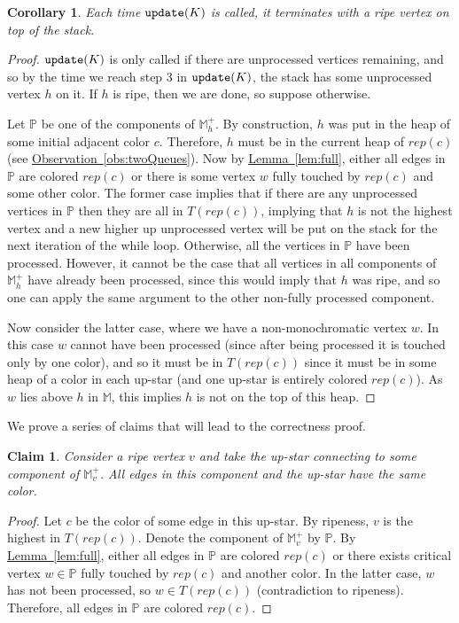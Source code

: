 \documentclass[11pt]{article}
\newtheorem{claim}[theorem]{Claim}
\newtheorem{corollary}[theorem]{Corollary}
\theoremstyle{definition}
\newcommand{\MM}{\mathbb{M}}
\newcommand{\PP}{\mathbb{P}}
\newcommand{\Lem}[1]{\hyperref[lem:#1]{Lemma~\ref*{lem:#1}}} %
\newcommand{\Obs}[1]{\hyperref[obs:#1]{Observation~\ref*{obs:#1}}} %
\newcommand{\rep}{rep}
\newcommand{\update}{{\tt update}}
\begin{document}
\begin{corollary}
\label{cor:terminate}
 Each time $\update(K)$ is called, it terminates with a ripe vertex on top of the stack.
\end{corollary}
\begin{proof}
 $\update(K)$ is only called if there are unprocessed vertices remaining, and so by the time we reach step 3 in 
 $\update(K)$, the stack has some unprocessed vertex $h$ on it.  
 If $h$ is ripe, then we are done, so suppose otherwise.
 
 Let $\PP$ be one of the components of $\MM^+_h$.  By construction, $h$ was put in the heap of some initial 
 adjacent color $c$.  Therefore, $h$ must be in the current heap of $\rep(c)$ (see \Obs{twoQueues}).  
 Now by \Lem{full}, either all edges in $\PP$ are colored $\rep(c)$ or  
 there is some vertex $w$ fully touched by $\rep(c)$ and some other color.  
 The former case implies that if there are any unprocessed vertices in $\PP$ then they are all in $T(\rep(c))$, 
 implying that $h$ is not the highest vertex and a new higher up unprocessed vertex will be put on the stack for the next iteration of the while loop.  
 Otherwise, all the vertices in $\PP$ have been processed.  
 However, it cannot be the case that all vertices in all components of $\MM^+_h$ have already been processed, 
 since this would imply that $h$ was ripe, and so one can apply the same argument to the other non-fully processed component. 
 
 Now consider the latter case, where we have a non-monochromatic vertex $w$.
 In this case $w$ cannot have been processed (since after being processed it is touched only by one color), 
 and so it must be in $T(\rep(c))$ since it must be in some heap of a color in each up-star (and one up-star is entirely colored $\rep(c)$).
 As $w$ lies above $h$ in $\MM$, this implies $h$ is not on the top of this heap.
\end{proof}

We prove a series of claims that will lead to the correctness proof.

\begin{claim} \label{clm:upstar} Consider a ripe vertex $v$ and take the up-star connecting
to some component of $\MM^+_v$. All edges in this component and the up-star have the same color.
\end{claim}

\begin{proof} Let $c$ be the color of some edge in this up-star.
By ripeness, $v$ is the highest in $T(\rep(c))$.
Denote the component of $\MM^+_v$ by $\PP$.
By \Lem{full}, either all edges in $\PP$ are colored $\rep(c)$ or there exists critical vertex $w \in \PP$
fully touched by $\rep(c)$ and another color. In the latter case, $w$ has not been processed,
so $w \in T(\rep(c))$ (contradiction to ripeness). Therefore, all edges in $\PP$ are colored $\rep(c)$.
\end{proof}
\end{document}

